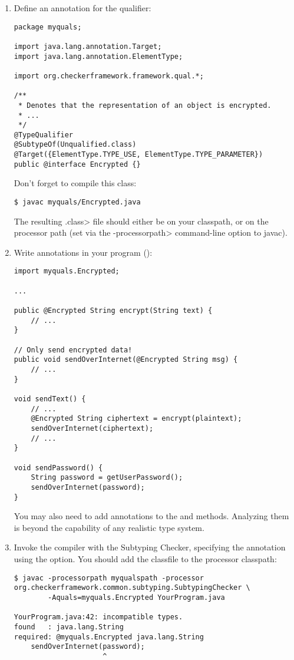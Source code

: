 \begin{enumerate}
\item
 Define an annotation for the  qualifier:

\begin{Verbatim}
package myquals;

import java.lang.annotation.Target;
import java.lang.annotation.ElementType;

import org.checkerframework.framework.qual.*;

/**
 * Denotes that the representation of an object is encrypted.
 * ...
 */
@TypeQualifier
@SubtypeOf(Unqualified.class)
@Target({ElementType.TYPE_USE, ElementType.TYPE_PARAMETER})
public @interface Encrypted {}
\end{Verbatim}

Don't forget to compile this class:

\begin{Verbatim}
$ javac myquals/Encrypted.java
\end{Verbatim}

The resulting \<.class> file should either be on your classpath, or on the
processor path (set via the \<-processorpath> command-line option to javac).

\item 
  Write  annotations in your program ():

\begin{Verbatim}
import myquals.Encrypted;

...

public @Encrypted String encrypt(String text) {
    // ...
}

// Only send encrypted data!
public void sendOverInternet(@Encrypted String msg) {
    // ...
}

void sendText() {
    // ...
    @Encrypted String ciphertext = encrypt(plaintext);
    sendOverInternet(ciphertext);
    // ...
}

void sendPassword() {
    String password = getUserPassword();
    sendOverInternet(password);
}
\end{Verbatim}

You may also need to add  annotations to the
 and  methods.  Analyzing them is beyond the
capability of any realistic type system.

\item
  Invoke the compiler with the Subtyping Checker, specifying the
   annotation using the  option.
  You should add the  classfile to the processor classpath:

\begin{Verbatim}
$ javac -processorpath myqualspath -processor org.checkerframework.common.subtyping.SubtypingChecker \
        -Aquals=myquals.Encrypted YourProgram.java

YourProgram.java:42: incompatible types.
found   : java.lang.String
required: @myquals.Encrypted java.lang.String
    sendOverInternet(password);
                     ^
\end{Verbatim}

\end{enumerate}



